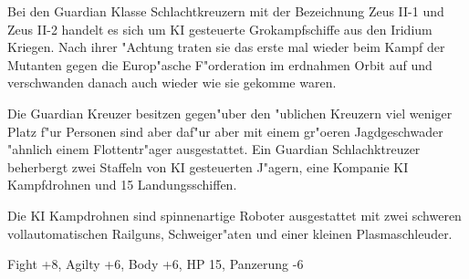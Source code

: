 
Bei den Guardian Klasse Schlachtkreuzern mit der Bezeichnung Zeus II-1 und Zeus II-2 handelt es sich um KI gesteuerte Gro\3kampfschiffe aus den Iridium Kriegen. Nach ihrer "Achtung traten sie das erste mal wieder beim Kampf der Mutanten gegen die Europ"asche F"orderation im erdnahmen Orbit auf und verschwanden danach auch wieder wie sie gekomme waren.

Die Guardian Kreuzer besitzen gegen"uber den "ublichen Kreuzern viel weniger Platz f"ur Personen sind aber daf"ur aber mit einem gr"o\3eren Jagdgeschwader "ahnlich einem Flottentr"ager ausgestattet. Ein Guardian Schlachktreuzer beherbergt zwei Staffeln von KI gesteuerten J"agern, eine Kompanie KI Kampfdrohnen und 15 Landungsschiffen.

Die KI Kampdrohnen sind spinnenartige Roboter ausgestattet mit zwei schweren vollautomatischen Railguns, Schwei\3ger"aten und einer kleinen Plasmaschleuder.

Fight +8, Agilty +6, Body +6, HP 15, Panzerung -6

